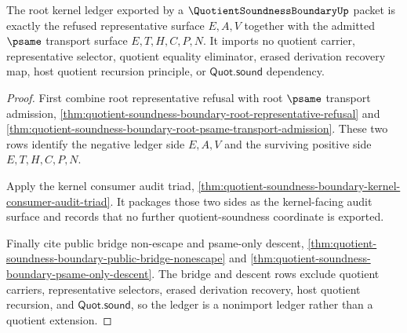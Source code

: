 \begin{theorem}
\label{thm:quotient-soundness-boundary-root-nonimport-ledger}
The root kernel ledger exported by a $\QuotientSoundnessBoundaryUp$ packet is exactly the refused representative surface $E,A,V$ together with the admitted $\psame$ transport surface $E,T,H,C,P,N$. It imports no quotient carrier, representative selector, quotient equality eliminator, erased derivation recovery map, host quotient recursion principle, or $\mathsf{Quot.sound}$ dependency.
\end{theorem}
\begin{proof}
First combine root representative refusal with root $\psame$ transport admission, \autoref{thm:quotient-soundness-boundary-root-representative-refusal} and \autoref{thm:quotient-soundness-boundary-root-psame-transport-admission}. These two rows identify the negative ledger side $E,A,V$ and the surviving positive side $E,T,H,C,P,N$.

Apply the kernel consumer audit triad, \autoref{thm:quotient-soundness-boundary-kernel-consumer-audit-triad}. It packages those two sides as the kernel-facing audit surface and records that no further quotient-soundness coordinate is exported.

Finally cite public bridge non-escape and psame-only descent, \autoref{thm:quotient-soundness-boundary-public-bridge-nonescape} and \autoref{thm:quotient-soundness-boundary-psame-only-descent}. The bridge and descent rows exclude quotient carriers, representative selectors, erased derivation recovery, host quotient recursion, and $\mathsf{Quot.sound}$, so the ledger is a nonimport ledger rather than a quotient extension.
\end{proof}
